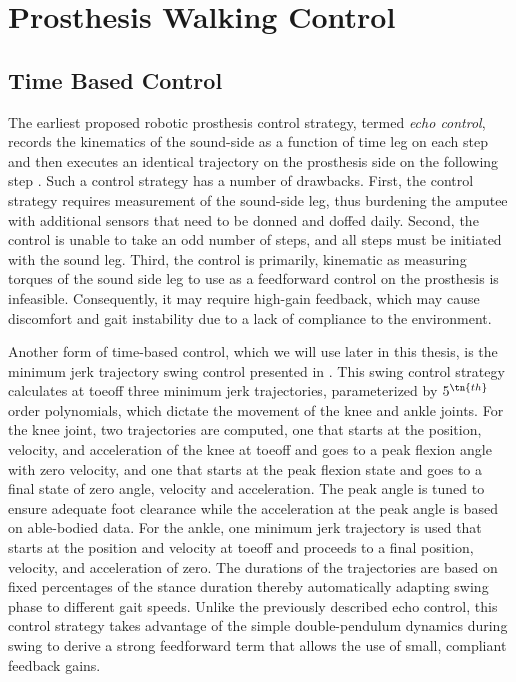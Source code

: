 \section{Prosthesis Walking Control}\label{sec:back_walking_control}

\subsection{Time Based Control}
The earliest proposed robotic prosthesis control strategy, termed \emph{echo
control}, records the kinematics of the sound-side as a function of time leg on
each step and then executes an identical trajectory on the prosthesis side on
the following step \citep{grimes1977feasibility,grimes1979active}. Such a
control strategy has a number of drawbacks. First, the control strategy requires
measurement of the sound-side leg, thus burdening the amputee with additional
sensors that need to be donned and doffed daily. Second, the control is unable
to take an odd number of steps, and all steps must be initiated with the sound
leg. Third, the control is primarily, kinematic as measuring torques of the
sound side leg to use as a feedforward control on the prosthesis is infeasible.
Consequently, it may require high-gain feedback, which may cause discomfort and
gait instability due to a lack of compliance to the environment.  

Another form of time-based control, which we will use later in this thesis, is
the minimum jerk trajectory swing control presented in \citet{lenzi2014speed}.
This swing control strategy calculates at toeoff three minimum jerk
trajectories, parameterized by $5^\tn{th}$ order polynomials, which dictate the
movement of the knee and ankle joints. For the knee joint, two trajectories are
computed, one that starts at the position, velocity, and acceleration of the
knee at toeoff and goes to a peak flexion angle with zero velocity, and one that
starts at the peak flexion state and goes to a final state of zero angle,
velocity and acceleration. The peak angle is tuned to ensure adequate foot
clearance while the acceleration at the peak angle is based on able-bodied data.
For the ankle, one minimum jerk trajectory is used that starts at the position
and velocity at toeoff and proceeds to a final position, velocity, and
acceleration of zero. The durations of the trajectories are based on fixed
percentages of the stance duration thereby automatically adapting swing phase to
different gait speeds. Unlike the previously described echo control, this
control strategy takes advantage of the simple double-pendulum dynamics during
swing to derive a strong feedforward term that allows the use of small,
compliant feedback gains.

